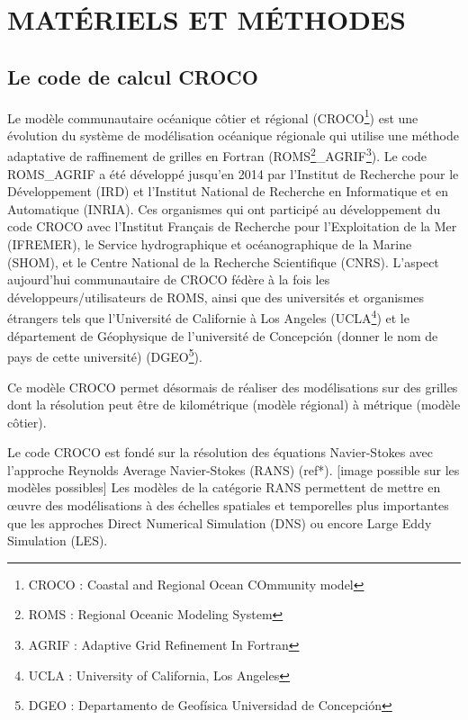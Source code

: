 \documentclass[10pt,a4paper,titlepage]{article}
\begin{document}
    
    
    \newpage
    
    \section{MATÉRIELS ET MÉTHODES}
    \label{sec:materiel_methodes}
    
    \subsection{Le code de calcul CROCO}
    \label{sub:croco}
    Le modèle communautaire océanique côtier et régional (CROCO\footnote{CROCO : Coastal and Regional Ocean COmmunity model}) est une évolution du système de modélisation océanique régionale qui utilise une méthode adaptative de raffinement de grilles en Fortran (ROMS\footnote{ROMS : Regional Oceanic Modeling System}\_AGRIF\footnote{AGRIF : Adaptive Grid Refinement In Fortran}).
    Le code ROMS\_AGRIF a été développé jusqu'en 2014 par l'Institut de Recherche pour le Développement (IRD) et l'Institut National de Recherche en Informatique et en Automatique (INRIA). Ces organismes qui ont participé au développement du code CROCO avec
    l'Institut Français de Recherche pour l'Exploitation de la Mer (IFREMER),
    le Service hydrographique et océanographique de la Marine (SHOM),
    et le Centre National de la Recherche Scientifique (CNRS).
    L'aspect aujourd'hui communautaire de CROCO fédère à la fois les développeurs/utilisateurs de ROMS, ainsi que des universités et organismes étrangers tels que l'Université de Californie à Los Angeles (UCLA\footnote{UCLA : University of California, Los Angeles})
    et le département de Géophysique de l'université de Concepción (\alert{donner le nom de pays de cette université}) (DGEO\footnote{DGEO : Departamento de Geofísica Universidad de Concepción}).
    
    
    Ce modèle CROCO permet désormais de réaliser des modélisations sur des grilles dont la résolution peut être de kilométrique (modèle régional) à métrique (modèle côtier).
    
    Le code CROCO est fondé sur la résolution des équations Navier-Stokes avec l'approche Reynolds Average Navier-Stokes (RANS) \alert{(ref*).
        [image possible sur les modèles possibles]}
    Les modèles de la catégorie RANS permettent de mettre en \oe{}uvre des modélisations à des échelles spatiales et temporelles plus importantes que les approches Direct Numerical Simulation (DNS) ou encore Large Eddy Simulation (LES).
    
\end{document}
